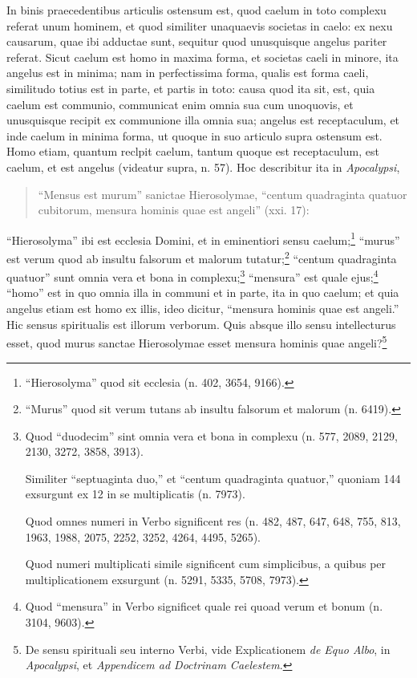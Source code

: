 
\begin{topic}{73}
    In binis praecedentibus articulis ostensum est, quod caelum in toto complexu referat unum hominem, et quod similiter
    unaquaevis societas in caelo: ex nexu causarum, quae ibi adductae sunt, sequitur quod unusquisque angelus pariter
    referat.
    Sicut caelum est homo in maxima forma, et societas caeli in minore, ita angelus est in minima; nam in perfectissima
    forma, qualis est forma caeli, similitudo totius est in parte, et partis in toto: causa quod ita sit, est, quia
    caelum est communio, communicat enim omnia sua cum unoquovis, et unusquisque recipit ex communione illa omnia sua;
    angelus est receptaculum, et inde caelum in minima forma, ut quoque in suo articulo supra ostensum est.
    Homo etiam, quantum reclpit caelum, tantum quoque est receptaculum, est caelum, et est angelus (videatur supra, n.
    57).
    Hoc describitur ita in \emph{Apocalypsi},
    \begin{quote}
        ``Mensus est murum'' sanictae Hierosolymae, ``centum quadraginta quatuor cubitorum, mensura hominis quae est
        angeli'' (xxi. 17):
    \end{quote}
    ``Hierosolyma'' ibi est ecclesia Domini, et in eminentiori sensu caelum;\footnote{``Hierosolyma'' quod sit ecclesia
    (n. 402, 3654, 9166).} ``murus'' est verum quod ab insultu falsorum et malorum tutatur;\footnote{``Murus'' quod sit
    verum tutans ab insultu falsorum et malorum (n. 6419).} ``centum quadraginta quatuor'' sunt omnia vera et bona in
    complexu;\footnote{Quod ``duodecim'' sint omnia vera et bona in complexu (n. 577, 2089, 2129, 2130, 3272, 3858,
    3913).

    Similiter ``septuaginta duo,'' et ``centum quadraginta quatuor,'' quoniam 144 exsurgunt ex 12 in se multiplicatis
    (n. 7973).

    Quod omnes numeri in Verbo significent res (n. 482, 487, 647, 648, 755, 813, 1963, 1988, 2075, 2252, 3252, 4264,
    4495, 5265).

    Quod numeri multiplicati simile significent cum simplicibus, a quibus per multiplicationem exsurgunt (n. 5291, 5335,
    5708, 7973).} ``mensura'' est quale ejus;\footnote{Quod ``mensura'' in Verbo significet quale rei quoad verum et
    bonum (n. 3104, 9603).} ``homo'' est in quo omnia illa in communi et in parte, ita in quo caelum; et quia angelus
    etiam est homo ex illis, ideo dicitur, ``mensura hominis quae est angeli.''
    Hic sensus spiritualis est illorum verborum.
    Quis absque illo sensu intellecturus esset, quod murus sanctae Hierosolymae esset mensura hominis quae
    angeli?\footnote{De sensu spirituali seu interno Verbi, vide Explicationem \emph{de Equo Albo}, in
    \emph{Apocalypsi}, et \emph{Appendicem ad Doctrinam Caelestem}.}
\end{topic}

